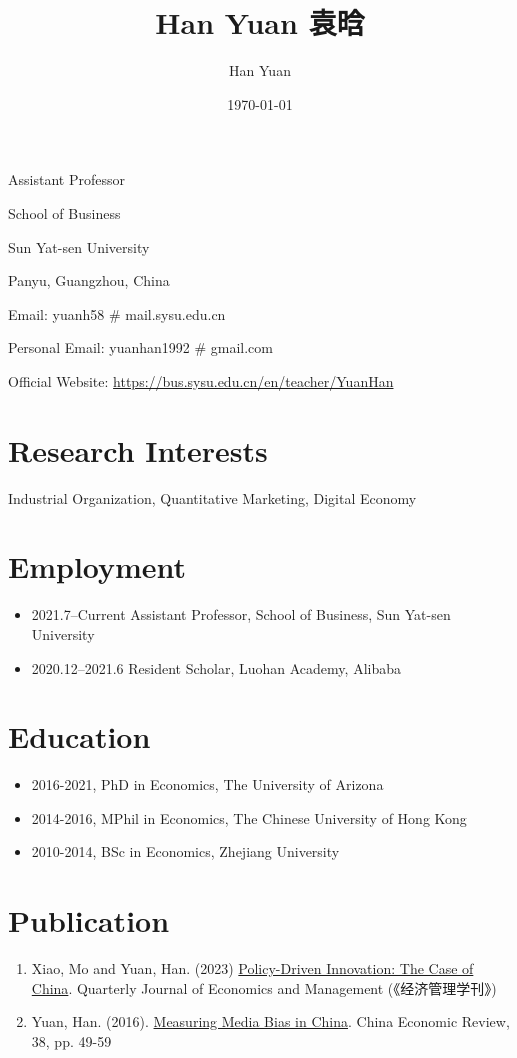 \documentclass[11pt]{article}
\author{Han Yuan}
\date{\today}
\title{Han Yuan 袁晗}
\begin{document}
\maketitle
Assistant Professor

School of Business

Sun Yat-sen University

Panyu, Guangzhou, China

Email: yuanh58 \# mail.sysu.edu.cn

Personal Email: yuanhan1992 \# gmail.com

Official Website: \url{https://bus.sysu.edu.cn/en/teacher/YuanHan}

\section{Research Interests}
\label{sec:orgddc8e47}
Industrial Organization, Quantitative Marketing, Digital Economy

\section{Employment}
\label{sec:orgd3ac847}
\begin{itemize}
\item 2021.7–Current Assistant Professor, School of Business, Sun Yat-sen University
\item 2020.12–2021.6 Resident Scholar, Luohan Academy, Alibaba
\end{itemize}

\section{Education}
\label{sec:orge8d35f2}
\begin{itemize}
\item 2016-2021, PhD in Economics, The University of Arizona
\item 2014-2016, MPhil in Economics, The Chinese University of Hong Kong
\item 2010-2014, BSc in Economics, Zhejiang University
\end{itemize}
\section{Publication}
\label{sec:org69dd385}
\begin{enumerate}
\item Xiao, Mo and Yuan, Han. (2023) \href{./files/政策驱动型创新——来自中国的研究.pdf}{Policy-Driven Innovation: The Case of China}. Quarterly Journal of Economics and Management (《经济管理学刊》)
\item Yuan, Han. (2016). \href{./files/Yuan - 2016 - Measuring media bias in China.pdf}{Measuring Media Bias in China}. China Economic Review, 38, pp. 49-59
\end{enumerate}
\end{document}
